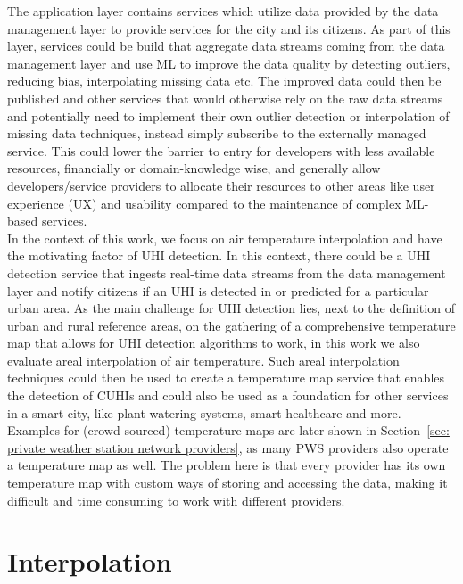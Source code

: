 The application layer contains services which utilize data provided by the data management layer to provide services for the city and its citizens. As part of this layer, services could be build that aggregate data streams coming from the data management layer and use ML to improve the data quality by detecting outliers, reducing bias, interpolating missing data etc. The improved data could then be published and other services that would otherwise rely on the raw data streams and potentially need to implement their own outlier detection or interpolation of missing data techniques, instead simply subscribe to the externally managed service. This could lower the barrier to entry for developers with less available resources, financially or domain-knowledge wise, and generally allow developers/service providers to allocate their resources to other areas like user experience (UX) and usability compared to the maintenance of complex ML-based services.\\
In the context of this work, we focus on air temperature interpolation and have the motivating factor of UHI detection. In this context, there could be a UHI detection service that ingests real-time data streams from the data management layer and notify citizens if an UHI is detected in or predicted for a particular urban area. As the main challenge for UHI detection lies, next to the definition of urban and rural reference areas, on the gathering of a comprehensive temperature map that allows for UHI detection algorithms to work, in this work we also evaluate areal interpolation of air temperature. Such areal interpolation techniques could then be used to create a temperature map service that enables the detection of CUHIs and could also be used as a foundation for other services in a smart city, like plant watering systems, smart healthcare and more. Examples for (crowd-sourced) temperature maps are later shown in Section~\ref{sec: private weather station network providers}, as many PWS providers also operate a temperature map as well. The problem here is that every provider has its own temperature map with custom ways of storing and accessing the data, making it difficult and time consuming to work with different providers.

\section{Interpolation}

